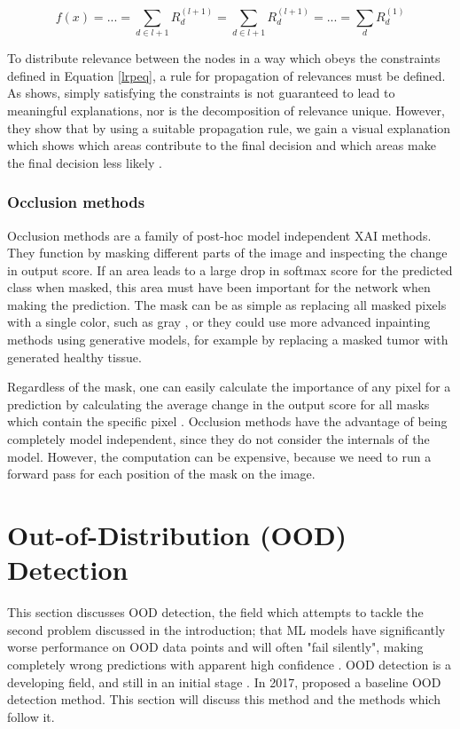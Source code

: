 \documentclass[UKenglish]{uiomasterthesis} %
\theoremstyle{definition}
\begin{document}
\begin{equation}
f(x) = ... = \sum_{d \in l + 1} R^{(l + 1)}_d = \sum_{d \in l + 1} R^{(l + 1)}_d = ... = \sum_d R^{(1)}_d
\label{lrpeq}
\end{equation}

To distribute relevance between the nodes in a way which obeys the constraints defined in Equation \ref{lrpeq}, a rule for propagation of relevances must be defined. As \cite{lrp} shows, simply satisfying the constraints is not guaranteed to lead to meaningful explanations, nor is the decomposition of relevance unique. However, they show that by using a suitable propagation rule, we gain a visual explanation which shows which areas contribute to the final decision and which areas make the final decision less likely \cite[28]{lrp}.
\\


\subsubsection{Occlusion methods}

Occlusion methods are a family of post-hoc model independent XAI methods. They function by masking different parts of the image and inspecting the change in output score. If an area leads to a large drop in softmax score for the predicted class when masked, this area must have been important for the network when making the prediction. The mask can be as simple as replacing all masked pixels with a single color, such as gray \cite{occlusion}, or they could use more advanced inpainting methods using generative models, for example by replacing a masked tumor with generated healthy tissue. 

Regardless of the mask, one can easily calculate the importance of any pixel for a prediction by calculating the average change in the output score for all masks which contain the specific pixel \cite{diagnostic}. Occlusion methods have the advantage of being completely model independent, since they do not consider the internals of the model. However, the computation can be expensive, because we need to run a forward pass for each position of the mask on the image.

\section{Out-of-Distribution (OOD) Detection} \label{ood_intro}

This section discusses OOD detection, the field which attempts to tackle the second problem discussed in the introduction; that ML models have significantly worse performance on OOD data points and will often "fail silently", making completely wrong predictions with apparent high confidence \cite{adversarial}. OOD detection is a developing field, and still in an initial stage \cite{ooddl}. In 2017, \cite{oodbaseline} proposed a baseline OOD detection method. This section will discuss this method and the methods which follow it.
\end{document}
